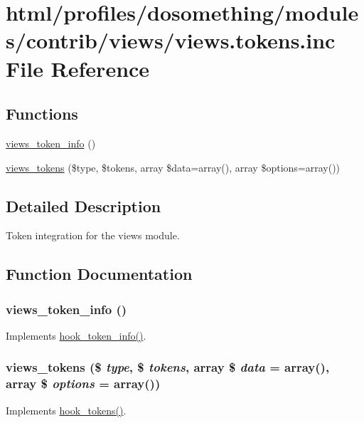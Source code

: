 \hypertarget{views_8tokens_8inc}{
\section{html/profiles/dosomething/modules/contrib/views/views.tokens.inc File Reference}
\label{views_8tokens_8inc}
}
\subsection*{Functions}
\begin{DoxyCompactItemize}
\item 
\hyperlink{views_8tokens_8inc_ac9aea2238db25b6e39017db05f5aab4c}{views\_\-token\_\-info} ()
\item 
\hyperlink{views_8tokens_8inc_a8741e4913d6047737eaf6108a2645f50}{views\_\-tokens} (\$type, \$tokens, array \$data=array(), array \$options=array())
\end{DoxyCompactItemize}


\subsection{Detailed Description}
Token integration for the views module. 

\subsection{Function Documentation}
\hypertarget{views_8tokens_8inc_ac9aea2238db25b6e39017db05f5aab4c}{
\subsubsection[{views\_\-token\_\-info}]{\setlength{\rightskip}{0pt plus 5cm}views\_\-token\_\-info ()}}
\label{views_8tokens_8inc_ac9aea2238db25b6e39017db05f5aab4c}
Implements \hyperlink{group__hooks_gab868597197cf36911f95dcd29ae0b954}{hook\_\-token\_\-info()}. \hypertarget{views_8tokens_8inc_a8741e4913d6047737eaf6108a2645f50}{
\subsubsection[{views\_\-tokens}]{\setlength{\rightskip}{0pt plus 5cm}views\_\-tokens (\$ {\em type}, \/  \$ {\em tokens}, \/  array \$ {\em data} = {\ttfamily array()}, \/  array \$ {\em options} = {\ttfamily array()})}}
\label{views_8tokens_8inc_a8741e4913d6047737eaf6108a2645f50}
Implements \hyperlink{group__hooks_ga3bfd87d9a19b2397b0f970e1cff7ea4f}{hook\_\-tokens()}. 